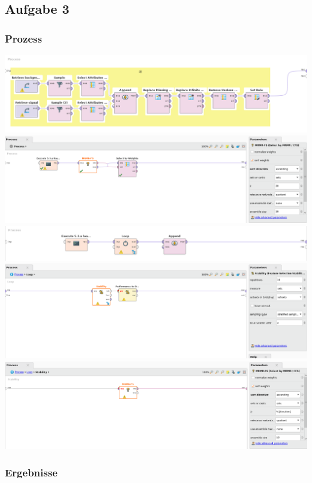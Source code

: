 \documentclass[12pt,ngerman,a4paperpaper,]{article}
\date{}
\begin{document}
\subsection{Aufgabe 3}\label{aufgabe-3}

\subsubsection{Prozess}\label{prozess}

\includegraphics{aufg3/a.png} \includegraphics{aufg3/b.png}
\includegraphics{aufg3/c1.png} \includegraphics{aufg3/c2.png}
\includegraphics{aufg3/c3.png}

\subsubsection{Ergebnisse}\label{ergebnisse}
\end{document}
